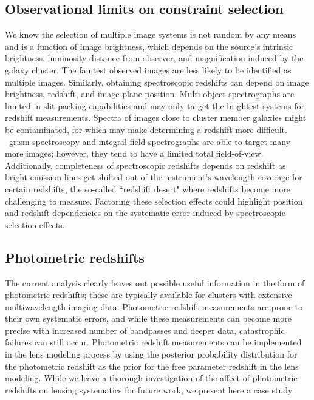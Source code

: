 \subsection{Observational limits on constraint selection}
We know the selection of multiple image systems is not random by any means and is a function of image brightness, which depends on the source's intrinsic brightness, luminosity distance from observer, and magnification induced by the galaxy cluster. The faintest observed images are less likely to be identified as multiple images. Similarly, obtaining spectroscopic redshifts can depend on image brightness, redshift, and image plane position. Multi-object spectrographs are limited in slit-packing capabilities and may only target the brightest systems for redshift measurements. Spectra of images close to cluster member galaxies might be contaminated, for which may make determining a redshift more difficult. \hst\ grism spectroscopy and integral field spectrographs are able to target many more images; however, they tend to have a limited total field-of-view. Additionally, completeness of spectroscopic redshifts depends on redshift as bright emission lines get shifted out of the instrument's wavelength coverage for certain redshifts, the so-called ``redshift desert" where redshifts become more challenging to measure. Factoring these selection effects could highlight position and redshift dependencies on the systematic error induced by spectroscopic selection effects.

\subsection{Photometric redshifts}
\label{chap3:subsec:photoz}
The current analysis clearly leaves out possible useful information in the form of photometric redshifts; these are typically available for clusters with extensive multiwavelength imaging data. Photometric redshift measurements are prone to their own systematic errors, and while these measurements can become more precise with increased number of bandpasses and deeper data, catastrophic failures can still occur. Photometric redshift measurements can be implemented in the lens modeling process by using the posterior probability distribution for the photometric redshift as the prior for the free parameter redshift in the lens modeling. While we leave a thorough investigation of the affect of photometric redshifts on lensing systematics for future work, we present here a case study.

